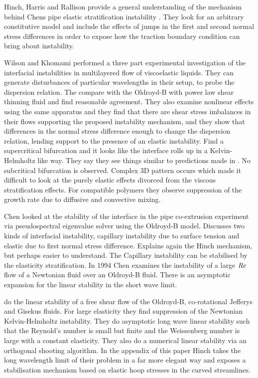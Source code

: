 \documentclass{jfm}
\newcommand\Rey{\mbox{\textit{Re}}}  %
\begin{document}
Hinch, Harris and Rallison \citep{Hinch1992} provide a general understanding of
the mechanism behind Chens pipe elastic stratification instability
\citep{Chen1991a}. They look for an arbitrary constitutive model and include
the effects of jumps in the first and second normal stress differences in order
to expose how the traction boundary condition can bring about instability.

Wilson and Khomami \citep{Wilson1992, Wilson1993a, Wilson1993b} performed a
three part experimental investigation of the interfacial instabilities in
multilayered flow of viscoelastic liquids. They can generate disturbances of
particular wavelengths in their setup, to probe the dispersion relation. The
compare with the Oldroyd-B with power law shear thinning fluid and find
reasonable agreement. They also examine nonlinear effects \citep{Wilson1993a}
using the same apparatus and they find that there are shear stress imbalances
in their flows supporting the proposed instability mechanism, and they show
that differences in the normal stress difference enough to change the
dispersion relation, lending support to the presence of an elastic instability.
Find a supercritical bifurcation and it looks like the interface rolls up in a
Kelvin-Helmholtz like way. They say they see things similar to predictions made
in \citet{Renardy1989}. No subcritical bifurcation is observed. Complex 3D
pattern occurs which made it difficult to look at the purely elastic effects
divorced from the viscous stratification effects. For compatible polymers
\citep{Wilson1993b} they observe suppression of the growth rate due to diffusive
and convective mixing.

Chen \citep{Chen1993} looked at the stability of the interface in the pipe
co-extrusion experiment via pseudospectral eigenvalue solver using the
Oldroyd-B model. Discusses two kinds of interfacial instability, capillary
instability due to surface tension and elastic due to first normal stress
difference.  Explains again the Hinch mechanism, but perhaps easier to
understand. The Capillary instability can be stabilised by the elasticity
stratification. In 1994 \citep{Chen1994} Chen examines the instability of a
large $\Rey$ flow of a Newtonian fluid over an Oldroyd-B fluid. There is an
asymptotic expansion for the linear stability in the short wave limit.

\citet{Azaiez1994} do the linear stability of a free shear flow of the
Oldroyd-B, co-rotational Jefferys and Gisekus fluids. For large elasticity they
find suppression of the Newtonian Kelvin-Helmholtz instability. They do
asymptotic long wave linear stability such that the Reynold's number is small
but finite and the Weissenberg number is large with a constant elasticity. They
also do a numerical linear stability via an orthogonal shooting algorithm. In
the appendix of this paper Hinch \citep{Azaiez1994} takes the long wavelength
limit of their problem in a far more elegant way and exposes a stabilisation
mechanism based on elastic hoop stresses in the curved streamlines.
\end{document}
